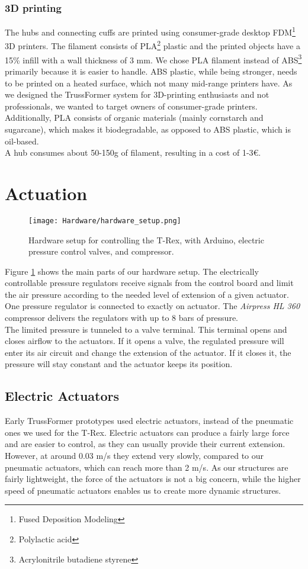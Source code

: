 \subsubsection{3D printing}
The hubs and connecting cuffs are printed using consumer-grade desktop FDM\footnote{Fused Deposition Modeling} 3D printers. The filament consists of PLA\footnote{Polylactic acid} plastic and the printed objects have a 15\% infill with a wall thickness of 3 mm. We chose PLA filament instead of ABS\footnote{Acrylonitrile butadiene styrene} primarily because it is easier to handle. ABS plastic, while being stronger, needs to be printed on a heated surface, which not many mid-range printers have. As we designed the TrussFormer system for 3D-printing enthusiasts and not professionals, we wanted to target owners of consumer-grade printers. Additionally, PLA consists of organic materials (mainly cornstarch and sugarcane), which makes it biodegradable, as opposed to ABS plastic, which is oil-based.\\
A hub consumes about 50-150g of filament, resulting in a cost of 1-3€.

\section{Actuation}
\begin{figure}[h!]
    \texttt{[image: Hardware/hardware\_setup.png]}
    \centering
    \caption{Hardware setup for controlling the T-Rex, with Arduino, electric pressure control valves, and compressor.}
    \label{fig:hardware_setup}
\end{figure}
Figure \ref{fig:hardware_setup} shows the main parts of our hardware setup. The electrically controllable pressure regulators receive signals from the control board and limit the air pressure according to the needed level of extension of a given actuator. One pressure regulator is connected to exactly on actuator. The \textit{Airpress HL 360} compressor delivers the regulators with up to 8 bars of pressure.\\
The limited pressure is tunneled to a valve terminal. This terminal opens and closes airflow to the actuators. If it opens a valve, the regulated pressure will enter its air circuit and change the extension of the actuator. If it closes it, the pressure will stay constant and the actuator keeps its position.

\subsection{Electric Actuators}
Early TrussFormer prototypes used electric actuators, instead of the pneumatic ones we used for the T-Rex. Electric actuators can produce a fairly large force and are easier to control, as they can usually provide their current extension. However, at around 0.03 m/s they extend very slowly, compared to our pneumatic actuators, which can reach more than 2 m/s. As our structures are fairly lightweight, the force of the actuators is not a big concern, while the higher speed of pneumatic actuators enables us to create more dynamic structures.

